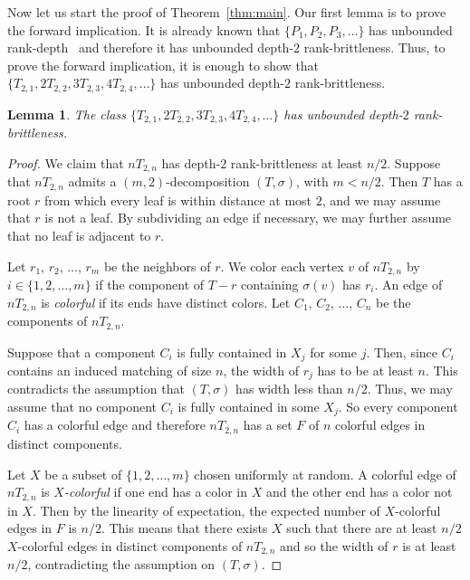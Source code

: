\documentclass[11pt]{article}
\newtheorem{lemma}[theorem]{Lemma}
\begin{document}
      Now let us start the proof of Theorem~\ref{thm:main}.
      Our first lemma is to prove the forward implication.
      It is already known that $\{P_1, P_2, P_3, \ldots \}$ has unbounded rank-depth~\cite{DKO2019} and therefore it has unbounded depth-$2$
      rank-brittleness.
      Thus, to prove the forward implication,
      it is enough to show that  $\{T_{2,1}, 2T_{2,2}, 3T_{2,3}, 4T_{2,4}, \ldots \}$
      has unbounded depth-$2$ rank-brittleness.
	\begin{lemma}
	The class $\{T_{2,1}, 2T_{2,2}, 3T_{2,3}, 4T_{2,4}, \ldots \}$ has unbounded depth-$2$ rank-brittleness.
	\end{lemma}
	\begin{proof}
	We claim that $nT_{2,n}$ has depth-$2$ rank-brittleness at least $n/2$.
	Suppose that $nT_{2,n}$ admits a $(m,2)$-decomposition $(T, \sigma)$, with $m<n/2$.
        Then $T$ has a root $r$ from which every leaf is within distance at most $2$, and we may assume that $r$ is not a leaf.
	By subdividing an edge if necessary,
	we may further assume that no leaf is adjacent to $r$.
	
	Let $r_1$, $r_2$, $\ldots$, $r_m$ be the neighbors of $r$.
        We color each vertex $v$ of $nT_{2,n}$ by $i\in\{1,2,\ldots,m\}$
        if the component of $T-r$ containing $\sigma(v)$
        has $r_i$.
        An edge of $nT_{2,n}$ is \emph{colorful} if its ends have distinct colors.
	Let $C_1$, $C_2$, $\ldots$, $C_n$ be the components of $nT_{2,n}$.
	
	Suppose that a component $C_i$ is fully contained in $X_j$ for some $j$.
	Then, since $C_i$ contains an induced matching of size $n$, 
	the width of $r_j$ has to be at least $n$.
	This contradicts the assumption that $(T, \sigma)$ has width less than $n/2$. 
	Thus, we may assume that no component $C_i$ is fully contained in some $X_j$.
        So every component $C_i$ has a colorful edge
        and therefore $nT_{2,n}$ has a set $F$ of
        $n$ colorful edges in distinct components.

        Let $X$ be a subset of $\{1,2,\ldots,m\}$ chosen uniformly at random.
        A colorful edge of $nT_{2,n}$ is \emph{$X$-colorful} if
        one end has a color in $X$ and the other end has a color not in $X$.
        Then by the linearity of expectation,
        the expected number of $X$-colorful edges in $F$
        is $n/2$.
        This means that
        there exists $X$ such that there are at least $n/2$ $X$-colorful edges in distinct components of $nT_{2,n}$ and so 
        the width of $r$ is at least $n/2$, contradicting the assumption on $(T,\sigma)$.
      \end{proof}
	
\end{document}

